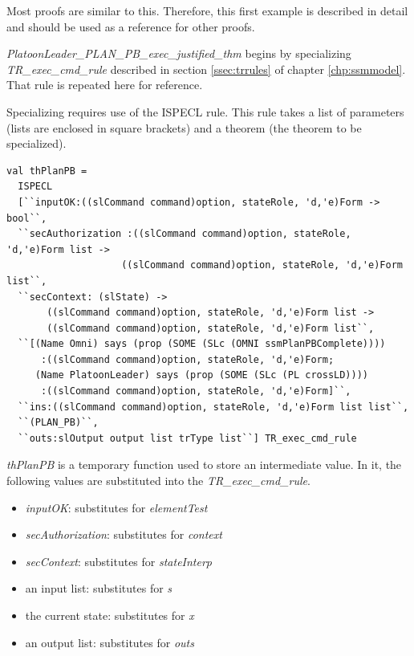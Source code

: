 \documentclass[../../main/main.tex]{subfiles}
\begin{document}
Most proofs are similar to this.  Therefore, this first example is described in detail and should be used as a reference for other proofs.

\textit{PlatoonLeader_PLAN_PB_exec_justified_thm} begins by specializing \textit{TR_exec_cmd_rule} described in section \ref{ssec:trrules} of chapter \ref{chp:ssmmodel}.  That rule is repeated here for reference.

\HOLssmTheoremsTRXXexecXXcmdXXrule

Specializing requires use of the ISPECL rule.  This rule takes a list of parameters (lists are enclosed in square brackets) and a theorem (the theorem to be specialized).  

\begin{lstlisting}
val thPlanPB =
  ISPECL
  [``inputOK:((slCommand command)option, stateRole, 'd,'e)Form -> bool``,
  ``secAuthorization :((slCommand command)option, stateRole, 'd,'e)Form list ->
                    ((slCommand command)option, stateRole, 'd,'e)Form list``,
  ``secContext: (slState) ->
       ((slCommand command)option, stateRole, 'd,'e)Form list ->
       ((slCommand command)option, stateRole, 'd,'e)Form list``,
  ``[(Name Omni) says (prop (SOME (SLc (OMNI ssmPlanPBComplete))))
      :((slCommand command)option, stateRole, 'd,'e)Form;
     (Name PlatoonLeader) says (prop (SOME (SLc (PL crossLD))))
      :((slCommand command)option, stateRole, 'd,'e)Form]``,
  ``ins:((slCommand command)option, stateRole, 'd,'e)Form list list``,
  ``(PLAN_PB)``,
  ``outs:slOutput output list trType list``] TR_exec_cmd_rule
\end{lstlisting}

\textit{thPlanPB} is a temporary function used to store an intermediate value. In it, the following values are substituted into the \textit{TR_exec_cmd_rule}.  

\begin{itemize}
\item \textit{inputOK}: substitutes for \textit{elementTest}
\item \textit{secAuthorization}: substitutes for \textit{context}
\item \textit{secContext}: substitutes for \textit{stateInterp}
\item an input list: substitutes for \textit{s}
\item the current state: substitutes for \textit{x}
\item an output list: substitutes for \textit{outs}
\end{itemize}
\end{document}
